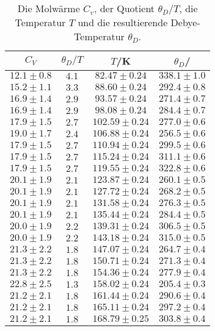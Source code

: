 \begin{table}
  \centering
  \caption{Die Molwärme $C_v$, der Quotient $\theta_D / T$, die Temperatur $T$ und die resultierende Debye-Temperatur $\theta_D$.}
  \label{tab:tab3}
  \begin{tabular}{c c c c}
    \toprule
		$C_V$ & $\theta_D / T$ & $T$/K & $\theta_D$/ \\
    \midrule
		$12.1\pm0.8$ & $4.1$ & $ 82.47\pm0.24$ & $338.1\pm1.0$ \\
		$15.2\pm1.1$ & $3.3$ & $ 88.60\pm0.24$ & $292.4\pm0.8$ \\
		$16.9\pm1.4$ & $2.9$ & $ 93.57\pm0.24$ & $271.4\pm0.7$ \\
		$16.9\pm1.4$ & $2.9$ & $ 98.08\pm0.24$ & $284.4\pm0.7$ \\
		$17.9\pm1.5$ & $2.7$ & $102.59\pm0.24$ & $277.0\pm0.6$ \\
		$19.0\pm1.7$ & $2.4$ & $106.88\pm0.24$ & $256.5\pm0.6$ \\
		$17.9\pm1.5$ & $2.7$ & $110.94\pm0.24$ & $299.5\pm0.6$ \\
		$17.9\pm1.5$ & $2.7$ & $115.24\pm0.24$ & $311.1\pm0.6$ \\
		$17.9\pm1.5$ & $2.7$ & $119.55\pm0.24$ & $322.8\pm0.6$ \\
		$20.1\pm1.9$ & $2.1$ & $123.87\pm0.24$ & $260.1\pm0.5$ \\
		$20.1\pm1.9$ & $2.1$ & $127.72\pm0.24$ & $268.2\pm0.5$ \\
		$20.1\pm1.9$ & $2.1$ & $131.58\pm0.24$ & $276.3\pm0.5$ \\
		$20.1\pm1.9$ & $2.1$ & $135.44\pm0.24$ & $284.4\pm0.5$ \\
		$20.0\pm1.9$ & $2.2$ & $139.31\pm0.24$ & $306.5\pm0.5$ \\
		$20.0\pm1.9$ & $2.2$ & $143.18\pm0.24$ & $315.0\pm0.5$ \\
		$21.3\pm2.2$ & $1.8$ & $147.07\pm0.24$ & $264.7\pm0.4$ \\
		$21.3\pm2.2$ & $1.8$ & $150.71\pm0.24$ & $271.3\pm0.4$ \\
		$21.3\pm2.2$ & $1.8$ & $154.36\pm0.24$ & $277.9\pm0.4$ \\
		$22.8\pm2.5$ & $1.3$ & $158.02\pm0.24$ & $205.4\pm0.3$ \\
		$21.2\pm2.1$ & $1.8$ & $161.44\pm0.24$ & $290.6\pm0.4$ \\
		$21.2\pm2.1$ & $1.8$ & $165.11\pm0.24$ & $297.2\pm0.4$ \\
		$21.2\pm2.1$ & $1.8$ & $168.79\pm0.25$ & $303.8\pm0.4$ \\

    \bottomrule
  \end{tabular}
\end{table}

